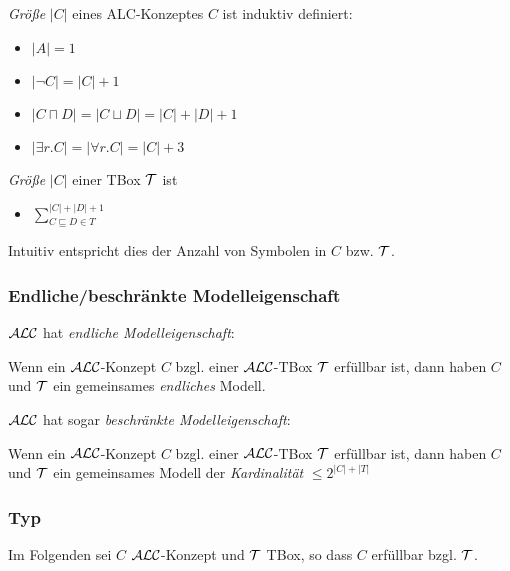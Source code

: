 \begin{definition}[Größe]
\emph{Größe} $\left| C \right|$ eines ALC-Konzeptes $C$ ist induktiv
definiert:

\begin{itemize}
\item
  $\left| A \right| = 1$
\item
  $\left| \neg C \right| = \left| C \right| + 1$
\item
  $\left| C \sqcap D \right| = \left| C \sqcup D \right| = \left| C \right| + \left| D \right| + 1$
\item
  $\left| \exists r.C \right| = \left| \forall r.C \right| = \left| C \right| + 3$
\end{itemize}

\emph{Größe} $\left| C \right|$ einer TBox $\mathcal{T}$ ist

\begin{itemize}
\item
  $\sum_{C \sqsubseteq D \in T}^{\left| C \right| + \left| D \right| + 1}$
\end{itemize}
\end{definition}

Intuitiv entspricht dies der Anzahl von Symbolen in $C$ bzw. $\mathcal{T}$.

\subsubsection{Endliche/beschränkte Modelleigenschaft}

$\mathcal{A}\mathcal{L}\mathcal{C}$ hat \emph{endliche Modelleigenschaft}:

\begin{theorem}
Wenn ein $\mathcal{A}\mathcal{L}\mathcal{C}$-Konzept $C$ bzgl. einer $\mathcal{A}\mathcal{L}\mathcal{C}$-TBox $\mathcal{T}$ erfüllbar ist, dann haben $C$ und $\mathcal{T}$ ein gemeinsames \emph{endliches} Modell.
\end{theorem}

$\mathcal{A}\mathcal{L}\mathcal{C}$ hat sogar \emph{beschränkte Modelleigenschaft}:

\begin{theorem}
Wenn ein $\mathcal{A}\mathcal{L}\mathcal{C}$-Konzept $C$ bzgl. einer $\mathcal{A}\mathcal{L}\mathcal{C}$-TBox $\mathcal{T}$ erfüllbar ist, dann haben $C$ und $\mathcal{T}$ ein gemeinsames Modell der \emph{Kardinalität} $\leq 2^{|C|+|T|}$
\end{theorem}

\subsubsection{Typ}

Im Folgenden sei $C$ $\mathcal{A}\mathcal{L}\mathcal{C}$-Konzept und $\mathcal{T}$ TBox, so dass $C$ erfüllbar bzgl. $\mathcal{T}$.

